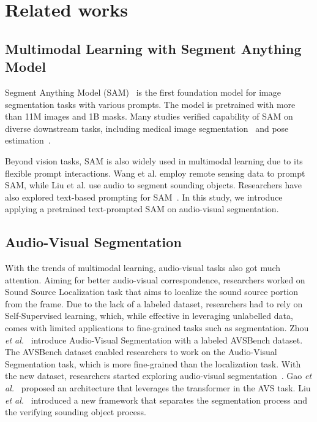 \section{Related works}
\subsection{Multimodal Learning with Segment Anything Model}
Segment Anything Model (SAM)~\cite{kirillov2023sam} is the first foundation model for image segmentation tasks with various prompts. The model is pretrained with more than 11M images and 1B masks. Many studies verified capability of SAM on diverse downstream tasks, including medical image segmentation~\cite{ma2024medisam} and pose estimation~\cite{lin2024posesam}.

Beyond vision tasks, SAM is also widely used in multimodal learning due to its flexible prompt interactions. Wang et al.\cite{wang2024remotesam} employ remote sensing data to prompt SAM, while Liu et al.\cite{liu2024annotation} use audio to segment sounding objects. Researchers have also explored text-based prompting for SAM~\cite{zhang2024evfsam}.
In this study, we introduce applying a pretrained text-prompted SAM on audio-visual segmentation.

\subsection{Audio-Visual Segmentation}
With the trends of multimodal learning, audio-visual tasks also got much attention. Aiming for better audio-visual correspondence, researchers worked on
Sound Source Localization task \cite{Zhao_2018_pixel,Chen_2021_hard} that aims to localize the sound source portion from the frame. Due to the lack of a labeled dataset, researchers had to rely on Self-Supervised learning, which, while effective in leveraging unlabelled data, comes with limited applications to fine-grained tasks such as segmentation.
Zhou \textit{et al.}~\cite{zhou2022avs} introduce Audio-Visual Segmentation with a labeled AVSBench dataset. The AVSBench dataset enabled researchers to work on the Audio-Visual Segmentation task, which is more fine-grained than the localization task. With the new dataset, researchers started exploring audio-visual segmentation~\cite{zhou2022avs,li2023catr}. Gao \textit{et al.}~\cite{gao2024avsegformer} proposed an architecture that leverages the transformer in the AVS task. Liu \textit{et al.}~\cite{liu2023avstwostages} introduced a new framework that separates the segmentation process and the verifying sounding object process. 

